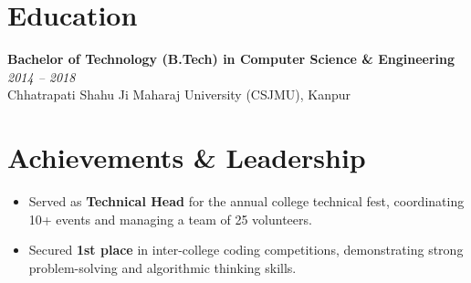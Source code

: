 \documentclass[11pt, a4paper]{article}
\begin{document}
\section*{Education}
\textbf{Bachelor of Technology (B.Tech) in Computer Science \& Engineering} \hfill \textit{2014 -- 2018} \\
Chhatrapati Shahu Ji Maharaj University (CSJMU), Kanpur

\section*{Achievements \& Leadership}
\begin{itemize}
  \item Served as \textbf{Technical Head} for the annual college technical fest, coordinating 10+ events and managing a team of 25 volunteers.
  \item Secured \textbf{1st place} in inter-college coding competitions, demonstrating strong problem-solving and algorithmic thinking skills.
\end{itemize}
\end{document}
